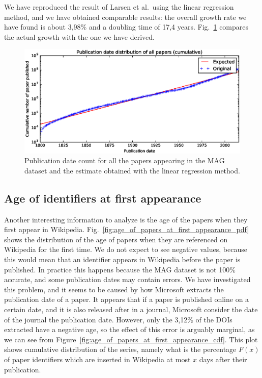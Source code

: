 We have reproduced the result of Larsen et al.\ using the linear regression method, and we have obtained comparable results: the overall growth rate we have found is about 3,98\% and a doubling time of 17,4 years.
Fig.~\ref{fig:publication_date_regression} compares the actual growth with the one we have derived.

\begin{figure}[h]
\centering
\includegraphics[keepaspectratio=true, width=\textwidth]{assets/publication_date_regression}
\caption{Publication date count for all the papers appearing in the \ac{MAG} dataset and the estimate obtained with the linear regression method.}
\label{fig:publication_date_regression}
\end{figure}

\subsection{Age of identifiers at first appearance}
Another interesting information to analyze is the age of the papers when they first appear in Wikipedia.
Fig.~\ref{fig:age_of_papers_at_first_appearance_pdf} shows the distribution of the age of papers when they are referenced on Wikipedia for the first time.
We do not expect to see negative values, because this would mean that an identifier appears in Wikipedia before the paper is published.
In practice this happens because the \ac{MAG} dataset is not 100\% accurate, and some publication dates may contain errors.
We have investigated this problem, and it seems to be caused by how Microsoft extracts the publication date of a paper.
It appears that if a paper is published online on a certain date, and it is also released after in a journal, Microsoft consider the date of the journal the publication date.
However, only the 3,12\% of the \acp{DOI} extracted have a negative age, so the effect of this error is arguably marginal, as we can see from Figure~\ref{fig:age_of_papers_at_first_appearance_cdf}.
This plot shows cumulative distribution of the series, namely what is the percentage $F(x)$ of paper identifiers which are inserted in Wikipedia at most $x$ days after their publication.

